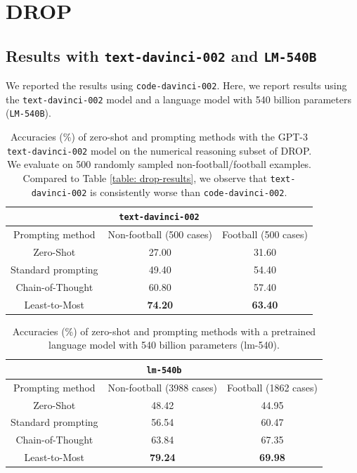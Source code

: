 \section{DROP}
\label{app:drop}

\subsection{Results with \texttt{text-davinci-002} and \texttt{LM-540B}}

We reported the results using \texttt{code-davinci-002}. Here, we report results using the \texttt{text-davinci-002} model and a language model with 540 billion parameters (\texttt{LM-540B}).

\begin{table}[h!]
\centering
\begin{tabular}{ |c|c|c|}
  \hline
  \multicolumn{3}{|c|}{\texttt{text-davinci-002}} \\
  \hline
  Prompting method & Non-football (500 cases) & Football (500 cases)  \\
  \hline
  Zero-Shot & 27.00 & 31.60 \\ 
  \hline
  Standard prompting  & 49.40 & 54.40 \\ 
  \hline
  Chain-of-Thought & 60.80 & 57.40 \\ 
  \hline
  Least-to-Most & \textbf{74.20} & \textbf{63.40} \\ 
  \hline
\end{tabular}
\vspace{5pt}
\caption{Accuracies (\%) of zero-shot and prompting methods with the GPT-3 \texttt{text-davinci-002} model on the numerical reasoning subset of DROP. We evaluate on 500 randomly sampled non-football/football examples. Compared to Table \ref{table: drop-results}, we observe that \texttt{text-davinci-002} is consistently worse than \texttt{code-davinci-002}.}
\label{table: drop-results-text-davinci}
\end{table}

\begin{table}[h!]
\centering
\begin{tabular}{ |c|c|c|}
  \hline
  \multicolumn{3}{|c|}{\texttt{lm-540b}} \\
  \hline
  Prompting method & Non-football (3988 cases) & Football (1862 cases)  \\
  \hline
  Zero-Shot & 48.42 & 44.95 \\ 
  \hline
  Standard prompting  & 56.54 & 60.47 \\ 
  \hline
  Chain-of-Thought & 63.84 & 67.35 \\ 
  \hline
  Least-to-Most & \textbf{79.24} & \textbf{69.98} \\ 
  \hline
\end{tabular}
\vspace{5pt}
\caption{Accuracies (\%) of zero-shot and prompting methods with a pretrained language model with 540 billion parameters (lm-540).}
\label{table: drop-results-lm540b}
\end{table}

